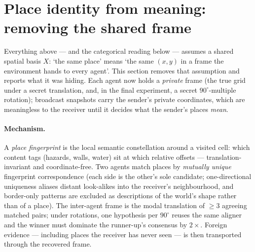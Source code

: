 \documentclass{article}
\begin{document}
\section{Place identity from meaning: removing the shared frame}
\label{p4:sec:semantic-identity}

Everything above --- and the categorical reading below --- assumes a
shared spatial basis $X$: `the same place' means `the same $(x,y)$ in
a frame the environment hands to every agent'. This section removes
that assumption and reports what it was hiding. Each agent now holds a
\emph{private} frame (the true grid under a secret translation, and,
in the final experiment, a secret $90^\circ$-multiple rotation);
broadcast snapshots carry the sender's private coordinates, which are
meaningless to the receiver until it decides what the sender's places
\emph{mean}.

\paragraph{Mechanism.} A \emph{place fingerprint} is the local
semantic constellation around a visited cell: which content tags
(hazards, walls, water) sit at which relative offsets ---
translation-invariant and coordinate-free. Two agents match places by
\emph{mutually unique} fingerprint correspondence (each side is the
other's sole candidate; one-directional uniqueness aliases distant
look-alikes into the receiver's neighbourhood, and border-only
patterns are excluded as descriptions of the world's shape rather
than of a place). The inter-agent frame is the modal translation of
$\ge 3$ agreeing matched pairs; under rotations, one hypothesis per
$90^\circ$ reuses the same aligner and the winner must dominate the
runner-up's consensus by $2\times$. Foreign evidence --- including
places the receiver has never seen --- is then transported through
the recovered frame.
\end{document}
